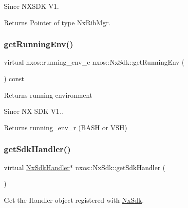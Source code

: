 \begin{DoxySince}{Since}
N\+X\+S\+DK V1.
\end{DoxySince}
\begin{DoxyReturn}{Returns}
Pointer of type \mbox{\hyperlink{classnxos_1_1_nx_rib_mgr}{Nx\+Rib\+Mgr}}. 
\end{DoxyReturn}
\mbox{\label{classnxos_1_1_nx_sdk_a6ebf9ceb029ce71ecfead7d9183ae4e3}} 
\subsubsection{\texorpdfstring{get\+Running\+Env()}{getRunningEnv()}}
{\footnotesize\ttfamily virtual nxos\+::running\+\_\+env\+\_\+e nxos\+::\+Nx\+Sdk\+::get\+Running\+Env (\begin{DoxyParamCaption}{ }\end{DoxyParamCaption}) const\hspace{0.3cm}{\ttfamily [pure virtual]}}

Returns running environment

\begin{DoxySince}{Since}
N\+X-\/\+S\+DK V1..
\end{DoxySince}
\begin{DoxyReturn}{Returns}
running\+\_\+env\+\_\+r (B\+A\+SH or V\+SH) 
\end{DoxyReturn}
\mbox{\label{classnxos_1_1_nx_sdk_a079be3a7d8861fc9817903b7a6b0e9ab}} 
\subsubsection{\texorpdfstring{get\+Sdk\+Handler()}{getSdkHandler()}}
{\footnotesize\ttfamily virtual \mbox{\hyperlink{classnxos_1_1_nx_sdk_handler}{Nx\+Sdk\+Handler}}$\ast$ nxos\+::\+Nx\+Sdk\+::get\+Sdk\+Handler (\begin{DoxyParamCaption}{ }\end{DoxyParamCaption})\hspace{0.3cm}{\ttfamily [pure virtual]}}

Get the Handler object registered with \mbox{\hyperlink{classnxos_1_1_nx_sdk}{Nx\+Sdk}}.

